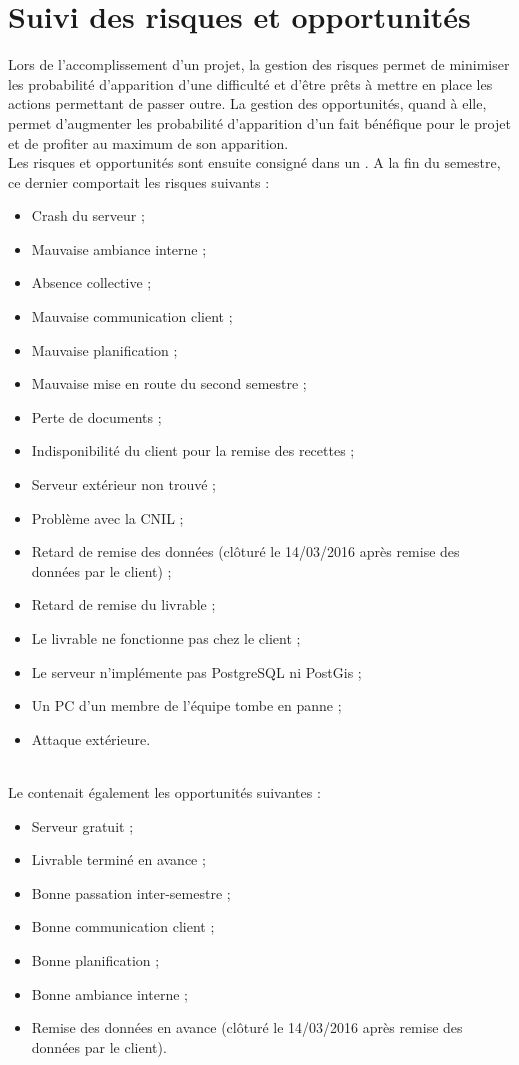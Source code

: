 \documentclass[asi]{picInsa}
\begin{document}
\section{Suivi des risques et opportunités}
Lors de l'accomplissement d'un projet, la gestion des risques permet de minimiser les probabilité d’apparition d'une difficulté et d'être prêts à mettre en place les actions permettant de passer outre. La gestion des opportunités, quand à elle, permet d'augmenter les probabilité d’apparition d'un fait bénéfique pour le projet et de profiter au maximum de son apparition. \\
Les risques et opportunités sont ensuite consigné dans un \PRO{}. A la fin du semestre, ce dernier comportait les risques suivants :
\begin{itemize}
\item Crash du serveur ;
\item Mauvaise ambiance interne ;
\item Absence collective ;
\item Mauvaise communication client ;
\item Mauvaise planification ;
\item Mauvaise mise en route du second semestre ;
\item Perte de documents ;
\item Indisponibilité du client pour la remise des recettes ;
\item Serveur extérieur non trouvé ;
\item Problème avec la CNIL ;
\item Retard de remise des données (clôturé le 14/03/2016 après remise des données par le client) ;
\item Retard de remise du livrable ;
\item Le livrable ne fonctionne pas chez le client ;
\item Le serveur n’implémente pas PostgreSQL ni PostGis ;
\item Un PC d’un membre de l’équipe tombe en panne ;
\item Attaque extérieure.
\end{itemize}
~\\
Le \PRO{} contenait également les opportunités suivantes : 
\begin{itemize}
\item Serveur gratuit ;
\item Livrable terminé en avance ;
\item Bonne passation inter-semestre ;
\item Bonne communication client ;
\item Bonne planification ;
\item Bonne ambiance interne ;
\item Remise des données en avance (clôturé le 14/03/2016 après remise des données par le client).
\end{itemize}
\end{document}
